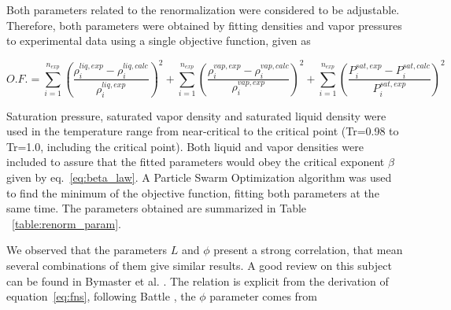 \documentclass[preprint,12pt,3p]{elsarticle}
\begin{document}
Both parameters related to the renormalization were considered to be adjustable.
Therefore, both parameters were obtained by fitting densities and vapor pressures to experimental data using a single objective function, given as

\begin{equation}   \label{eq:OF}
O.F.=\sum_{i=1}^{n_{exp}} \left(\frac{\rho_{i}^{liq,exp}-\rho_{i}^{liq,calc}}{\rho_{i}^{liq,exp}}\right)^2 + \sum_{i=1}^{n_{exp}} \left(\frac{\rho_{i}^{vap,exp}-\rho_{i}^{vap,calc}}{\rho_{i}^{vap,exp}}\right)^2 + \sum_{i=1}^{n_{exp}} \left(\frac{P_{i}^{sat,exp}-P_{i}^{sat,calc}}{P_{i}^{sat,exp}}\right)^2
\end{equation}

Saturation pressure, saturated vapor density and saturated liquid density were used in the temperature range from near-critical to the critical point (Tr=0.98 to Tr=1.0, including the critical point).
Both liquid and vapor densities were included to assure that the fitted parameters would obey the critical exponent $\beta$ given by eq.~\ref{eq:beta_law}.
A Particle Swarm Optimization algorithm was used to find the minimum of the objective function, fitting both parameters at the same time.
The parameters obtained are summarized in Table ~\ref{table:renorm_param}.

\begin{table}[ht!]
\centering
\caption{Estimated Parameters for the renormalization method}
\label{table:renorm_param}
\end{table}

We observed that the parameters $L$ and $\phi$ present a strong correlation, that mean several combinations of them give similar results.
A good review on this subject can be found in Bymaster et al.
\citep{bymaster2008renormalization}.
The relation is explicit from the derivation of equation~\ref{eq:fns}, following Battle \cite{battlerenorm}, the $\phi$ parameter comes from
\end{document}
